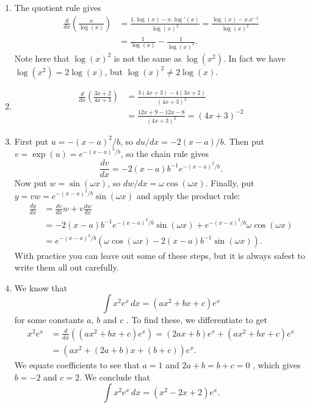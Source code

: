 \documentclass{amsart}
\newcommand{\om}{\omega}
\renewcommand{\:}       {\colon}
\newcommand{\mks}[1]    {}
\newcommand{\mk}        {}
\begin{document}
\begin{enumerate}
 \item %
  The quotient rule gives
  \begin{align*}
   \frac{d}{dx}\left(\frac{x}{\log(x)}\right) 
    &= \frac{1.\log(x) - x.\log'(x)}{\log(x)^2} \mk 
     = \frac{\log(x) - x.x^{-1}}{\log(x)^2}  \mk \\
    &= \frac{1}{\log(x)} - \frac{1}{\log(x)^2} \mk.
  \end{align*}
  Note here that $\log(x)^2$ is not the same as $\log(x^2)$.  In fact
  we have $\log(x^2)=2\log(x)$, but $\log(x)^2\neq 2\log(x)$.

 \item %
  \begin{align*}
   \frac{d}{dx}\left(\frac{3x+2}{4x+3}\right) 
    &= \frac{3(4x+3)-4(3x+2)}{(4x+3)^2} \mk \\
    &= \frac{12x+9-12x-8}{(4x+3)^2} = (4x+3)^{-2} \mk   
  \end{align*}

 \item %
  First put $u=-(x-a)^2/b$, so $du/dx=-2(x-a)/b$.  Then put
  $v=\exp(u)=e^{-(x-a)^2/b}$, so the chain rule gives
  \[ \frac{dv}{dx} = -2(x-a)b^{-1}e^{-(x-a)^2/b}. \mks{2} \]
  Now put $w=\sin(\omega x)$, so $dw/dx=\om\cos(\om x)$.  
  Finally, put $y=vw=e^{-(x-a)^2/b}\sin(\om x)$ and apply the product
  rule: 
  \begin{align*}
   \frac{dy}{dx} &= \frac{dv}{dx}w + v\frac{dw}{dx} \\
   &= -2(x-a)b^{-1}e^{-(x-a)^2/b} \sin(\om x) + 
      e^{-(x-a)^2/b} \om\cos(\om x) \\
   &= e^{-(x-a)^2/b}(\om\cos(\om x) - 2(x-a)b^{-1}\sin(\om x)) \mks{2}.
  \end{align*}
  With practice you can leave out some of these steps, but it is
  always safest to write them all out carefully.

 \item %
  We know that
  \[ \int x^2 e^x\, dx = (ax^2+bx+c) e^x \]
  for some constants $a$, $b$ and $c$ \mks{2}.  To find these, we
  differentiate to get 
  \begin{align*}
   x^2 e^x &= \frac{d}{dx}((ax^2+bx+c) e^x) 
    = (2ax+b)e^x + (ax^2+bx+c) e^x \mk \\
    &= (ax^2+(2a+b)x+(b+c))e^x.
  \end{align*}
  We equate coefficients to see that $a=1$ and $2a+b=b+c=0$ \mk, which
  gives $b=-2$ and $c=2$.  We conclude that
  \[ \int x^2 e^x\, dx = (x^2-2x+2) e^x. \mk \]


\end{enumerate}
\end{document}
